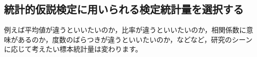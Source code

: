 \documentclass{ltjsbook}
\begin{document}




\subsection{統計的仮説検定に用いられる検定統計量を選択する}
例えば平均値が違うといいたいのか，比率が違うといいたいのか，相関係数に意味があるのか，度数のばらつきが違うといいたいのか，などなど，研究のシーンに応じて考えたい標本統計量は変わります。
\end{document}
